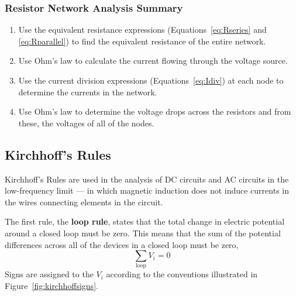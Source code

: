 \documentclass[11pt]{article}
\begin{document}
\subsubsection*{Resistor Network Analysis Summary}
\begin{enumerate}
\item Use the equivalent resistance expressions
  (Equations~\ref{eq:Rseries} and \ref{eq:Rparallel}) to find the
  equivalent resistance of the entire network.

\item Use Ohm's law to calculate the current flowing through the
  voltage source.

\item Use the current division expressions
  (Equations~\ref{eq:Idiv}) at each node to determine the currents
  in the network.

\item Use Ohm's law to determine the voltage drops across the
  resistors and from these, the voltages of all of the nodes.
\end{enumerate}
\begin{latexonly}
  \noindent
  \hrulefill
\end{latexonly}
\htmlrule
  
\subsection{Kirchhoff's Rules}
\label{sec:kirchhoff}

Kirchhoff's Rules are used in the analysis of DC circuits and AC
circuits in the low-frequency limit --- in which magnetic induction
does not induce currents in the wires connecting elements in the
circuit.

The first rule, the \textbf{loop rule}, states that the total change
in electric potential around a closed loop must be zero. This means
that the sum of the potential differences across all of the devices in
a closed loop must be zero,
\begin{equation}
  \sum_\mathrm{loop} V_i = 0
  \label{eq:Loop}
\end{equation}
Signs are assigned to the $V_i$ according to the conventions
illustrated in Figure~\ref{fig:kirchhoffsigns}.
\end{document}

